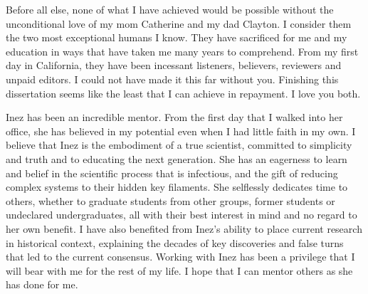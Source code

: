 \documentclass{ucbthesis}
\begin{document}
\begin{frontmatter}



\tableofcontents
\clearpage
\listoffigures
\clearpage
\listoftables

\begin{acknowledgements}
Before all else, none of what I have achieved would be possible without the unconditional love of my mom Catherine and my dad Clayton. I consider them the two most exceptional humans I know. They have sacrificed for me and my education in ways that have taken me many years to comprehend. From my first day in California, they have been incessant listeners, believers, reviewers and unpaid editors. I could not have made it this far without you. Finishing this dissertation seems like the least that I can achieve in repayment. I love you both.

Inez has been an incredible mentor. From the first day that I walked into her office, she has believed in my potential even when I had little faith in my own. I believe that Inez is the embodiment of a true scientist, committed to simplicity and truth and to educating the next generation. She has an eagerness to learn and belief in the scientific process that is infectious, and the gift of reducing complex systems to their hidden key filaments. She selflessly dedicates time to others, whether to graduate students from other groups, former students or undeclared undergraduates, all with their best interest in mind and no regard to her own benefit. I have also benefited from Inez's ability to place current research in historical context, explaining the decades of key discoveries and false turns that led to the current consensus. Working with Inez has been a privilege that I will bear with me for the rest of my life. I hope that I can mentor others as she has done for me.


\end{acknowledgements}
\end{frontmatter}
\end{document}
